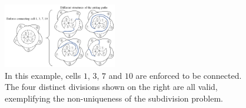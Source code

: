 \documentclass[journal]{IEEEtran}
\begin{document}

\begin{figure}[t]
\centering
\includegraphics[width = 0.44\textwidth]{figures/proof/fig_only_one_division_3}
\caption{In this example, cells $1$, $3$, $7$ and $10$ are enforced to be connected.
The four distinct divisions shown on the right are all valid, exemplifying the non-uniqueness of the subdivision problem.
}\label{fig_not_same_cutting_path}
\end{figure}
\end{document}
